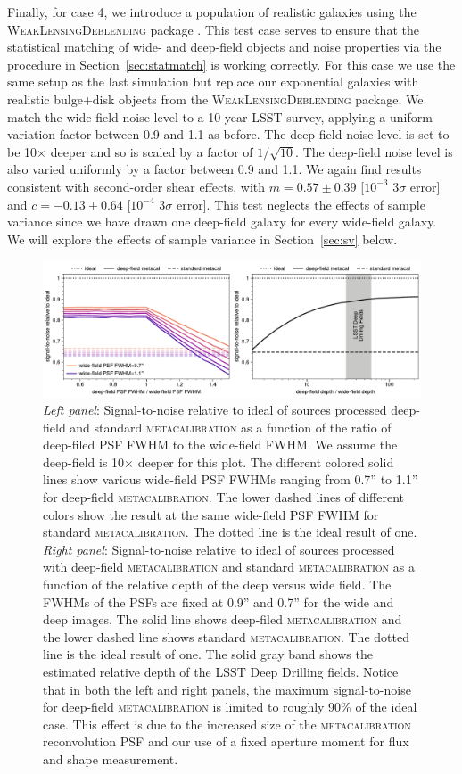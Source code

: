 \documentclass[twocolumn]{openjournal}
\makeatletter
\newcommand{\mcal}{\textsc{metacalibration}\@\xspace}
\newcommand{\descwl}{\textsc{WeakLensingDeblending}\@\xspace}
\makeatother
\begin{document}
Finally, for case 4, we introduce a population of realistic galaxies using the \descwl
package \citep{WeakLensingDeblendingPaper,WeakLensingDeblendingSoftware}. This test case
serves to ensure that the statistical matching of wide- and deep-field objects and noise
properties via the procedure in Section~\ref{sec:statmatch} is working correctly. For
this case we use the same setup as the last simulation but replace our exponential
galaxies with realistic bulge+disk objects from the \descwl package. We match the
wide-field noise level to a 10-year LSST survey, applying a uniform variation factor
between 0.9 and 1.1 as before. The deep-field noise level is set to be 10$\times$ deeper
and so is scaled by a factor of $1/\sqrt{10}$. The deep-field noise level is also varied
uniformly by a factor between 0.9 and 1.1. We again find results consistent with
second-order shear effects, with $m=0.57\pm0.39$ [$10^{-3}$ $3\sigma$ error] and
$c=-0.13\pm0.64$ [$10^{-4}$ $3\sigma$ error]. This test neglects the effects of sample
variance since we have drawn one deep-field galaxy for every wide-field galaxy. We will
explore the effects of sample variance in Section~\ref{sec:sv} below.


\begin{figure}
    \centering
    \includegraphics[width=\textwidth]{s2n_ratio.pdf}
    \caption{
      \textit{Left panel}: Signal-to-noise relative to ideal of sources processed deep-field and standard \mcal
      as a function of the ratio of deep-filed PSF FWHM to the wide-field FWHM. We assume the deep-field is
      10$\times$ deeper for this plot. The different colored solid lines show various wide-field PSF FWHMs ranging from 0.7'' to
      1.1'' for deep-field \mcal. The lower dashed lines of different colors show the result at the same wide-field PSF FWHM for
      standard \mcal. The dotted line is the ideal result of one.
      \textit{Right panel}: Signal-to-noise relative to ideal of sources processed with deep-field \mcal and standard \mcal as a function of the relative depth of the deep versus wide field. The FWHMs of the PSFs are fixed at 0.9''
      and 0.7'' for the wide and deep images. The solid line shows deep-filed \mcal and the lower dashed line shows standard \mcal.
      The dotted line is the ideal result of one.
      The solid gray band shows the estimated relative depth of the LSST Deep Drilling fields.
      Notice that in both the left and right panels, the maximum signal-to-noise for deep-field \mcal is limited to roughly 90\% of
      the ideal case. This effect is due to the increased size of the \mcal reconvolution PSF and our use of a fixed aperture moment
      for flux and shape measurement.}
    \label{fig:s2n}
\end{figure}
\end{document}
